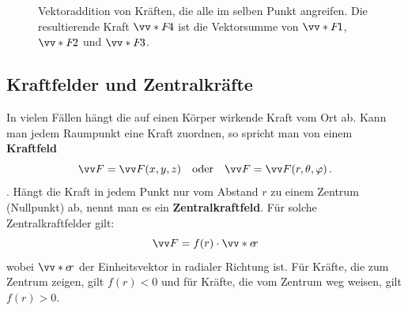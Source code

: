 \begin{figure}[htbp]
    \centering
    \caption{Vektoraddition von Kräften, die alle im selben Punkt angreifen. Die resultierende Kraft $\protect\ivecS{F}{4}$ ist die Vektorsumme von $\protect\ivecS{F}{1}$, $\protect\ivecS{F}{2}$ und $\protect\ivecS{F}{3}$.}\label{fig: vektoraddition_von_kräften_dynamik}
\end{figure}


\subsection{Kraftfelder und Zentralkräfte}\label{subsec: kraftfelder}

In vielen Fällen hängt die auf einen Körper wirkende Kraft vom Ort ab. Kann man jedem Raumpunkt eine Kraft zuordnen, so spricht man von einem \textbf{Kraftfeld} 
\begin{equation}
    \ivec{F} = \ivec{F}(x,y,z)\quad \text{oder} \quad \ivec{F} = \ivec{F}(r,\theta,\varphi)\mDot
\end{equation}. 
Hängt die Kraft in jedem Punkt nur vom Abstand $r$ zu einem Zentrum (\zB Nullpunkt) ab, nennt man es ein \textbf{Zentralkraftfeld}. Für solche Zentralkraftfelder gilt:
\begin{equation}
    \ivec{F} = f(r) \cdot \ivecS{e}{r}
\end{equation}
wobei $\ivecS{e}{r}$ der Einheitsvektor in radialer Richtung ist. Für Kräfte, die zum Zentrum zeigen, gilt $f(r) < 0$ und für Kräfte, die vom Zentrum weg weisen, gilt $f(r) > 0$.

